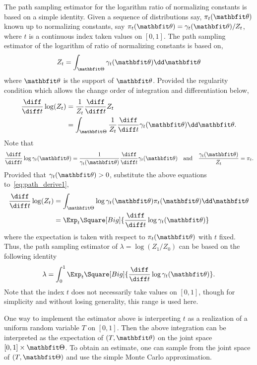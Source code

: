 The path sampling estimator for the logarithm ratio of normalizing constants
is based on a simple identity. Given a sequence of distributions say,
$\pi_t(\bth)$ known up to normalizing constants, say $\pi_t(\bth) =
\gamma_t(\bth)/Z_t$, where $t$ is a continuous index taken values on $[0,1]$.
The path sampling estimator of the logarithm of ratio of normalizing constants
is based on,
\begin{equation}
  Z_t = \int_{\bTh}\gamma_t(\bth)\dd\bth
\end{equation}
where $\bth$ is the support of $\bth$. Provided the regularity condition
which allows the change order of integration and differentiation below,
\begin{align}
  \frac{\diff}{\diff t}\log(Z_t)
  &= \frac{1}{Z_t}\frac{\diff}{\diff t}Z_t \notag\\
  &= \int_{\bTh}\frac{1}{Z_t}
  \frac{\diff}{\diff t}\gamma_t(\bth)\dd\bth.
  \label{eq:path_derive1}
\end{align}
Note that
\begin{equation}
  \frac{\diff}{\diff t}\log\gamma_t(\bth)
  = \frac{1}{\gamma_t(\bth)}\frac{\diff}{\diff t}\gamma_t(\bth)
  \quad\text{and}\quad
  \frac{\gamma_t(\bth)}{Z_t} = \pi_t.
\end{equation}
Provided that $\gamma_t(\bth)>0$, substitute the above equations
to~\eqref{eq:path_derive1},
\begin{align}
  \frac{\diff}{\diff t}\log(Z_t)
  &= \int_{\bTh}\log\gamma_t(\bth)\pi_t(\bth)\dd\bth \notag\\
  &= \Exp_t\Square[Big]{\frac{\diff}{\diff t}\log\gamma_t(\bth)}
\end{align}
where the expectation is taken with respect to $\pi_t(\bth)$ with $t$ fixed.
Thus, the path sampling estimator of $\lambda=\log(Z_1/Z_0)$ can be based on
the following identity
\begin{equation}
  \lambda=
  \int_0^1 \Exp_t\Square[Big]{\frac{\diff}{\diff t}\log \gamma_t(\bth)}.
  \label{eq:z_path}
\end{equation}
Note that the index $t$ does not necessarily take values on $[0,1]$, though
for simplicity and without losing generality, this range is used here.

One way to implement the estimator above is interpreting $t$ as a realization
of a uniform random variable $T$ on $[0,1]$. Then the above integration can be
interpreted as the expectation of $(T,\bth)$ on the joint space
$[0,1]\times\bTh$. To obtain an estimate, one can sample from the joint
space of $(T, \bTh)$ and use the simple Monte Carlo approximation.

